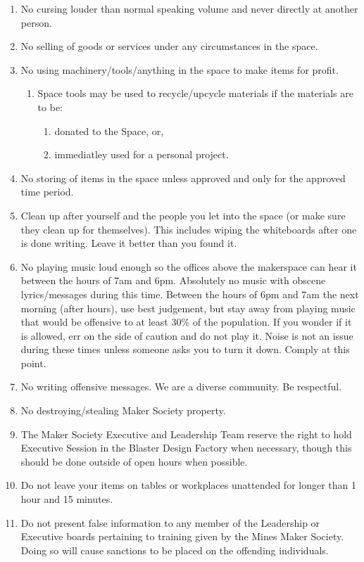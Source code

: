 \documentclass[12pt,letterpaper]{article}
\begin{document}
\begin{enumerate}
    \item No cursing louder than normal speaking volume and never directly at another person.  
    \item No selling of goods or services under any circumstances in the space.  
    \item No using machinery/tools/anything in the space to make items for profit.
    \begin{enumerate}
        \item Space tools may be used to recycle/upcycle materials if the materials are to be:
        \begin{enumerate}
            \item donated to the Space, or,
            \item immediatley used for a personal project.
        \end{enumerate}
    \end{enumerate} 
    \item No storing of items in the space unless approved and only for the approved time period.  
    \item Clean up after yourself and the people you let into the space (or make sure they clean up for themselves). This includes wiping the whiteboards after one is done writing. Leave it better than you found it. 
    \item No playing music loud enough so the offices above the makerspace can hear it between the hours of 7am and 6pm. Absolutely no music with obscene lyrics/messages during this time. Between the hours of 6pm and 7am the next morning (after hours), use best judgement, but stay away from playing music that would be offensive to at least 30\% of the population. If you wonder if it is allowed, err on the side of caution and do not play it. Noise is not an issue during these times unless someone asks you to turn it down. Comply at this point.  
    \item No writing offensive messages. We are a diverse community. Be respectful. 
    \item No destroying/stealing Maker Society property.  
    \item The Maker Society Executive and Leadership Team reserve the right to hold Executive Session in the Blaster Design Factory when necessary, though this should be done outside of open hours when possible. 
    \item Do not leave your items on tables or workplaces unattended for longer than 1 hour and 15 minutes.
    \item Do not present false information to any member of the Leadership or Executive boards pertaining to training given by the Mines Maker Society.
    Doing so will cause sanctions to be placed on the offending individuals.
\end{enumerate}
\end{document}
